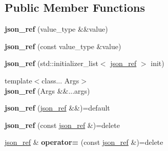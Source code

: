 \subsection*{Public Member Functions}
\begin{DoxyCompactItemize}
\item 
{\bfseries json\+\_\+ref} (value\+\_\+type \&\&value)\hypertarget{classnlohmann_1_1detail_1_1json__ref_ae1adf5bcee8b6fa0c358710604fb1938}{}\label{classnlohmann_1_1detail_1_1json__ref_ae1adf5bcee8b6fa0c358710604fb1938}

\item 
{\bfseries json\+\_\+ref} (const value\+\_\+type \&value)\hypertarget{classnlohmann_1_1detail_1_1json__ref_a8c3eb3c6e952ed0cd7eece586ab4047c}{}\label{classnlohmann_1_1detail_1_1json__ref_a8c3eb3c6e952ed0cd7eece586ab4047c}

\item 
{\bfseries json\+\_\+ref} (std\+::initializer\+\_\+list$<$ \hyperlink{classnlohmann_1_1detail_1_1json__ref}{json\+\_\+ref} $>$ init)\hypertarget{classnlohmann_1_1detail_1_1json__ref_adfba2db547283a7c6a5df9a32e72efc5}{}\label{classnlohmann_1_1detail_1_1json__ref_adfba2db547283a7c6a5df9a32e72efc5}

\item 
{\footnotesize template$<$class... Args$>$ }\\{\bfseries json\+\_\+ref} (Args \&\&...args)\hypertarget{classnlohmann_1_1detail_1_1json__ref_a84a813ad1c4b9524704b18684afd0708}{}\label{classnlohmann_1_1detail_1_1json__ref_a84a813ad1c4b9524704b18684afd0708}

\item 
{\bfseries json\+\_\+ref} (\hyperlink{classnlohmann_1_1detail_1_1json__ref}{json\+\_\+ref} \&\&)=default\hypertarget{classnlohmann_1_1detail_1_1json__ref_a59221ddbd756ca24d289c787fab38dbc}{}\label{classnlohmann_1_1detail_1_1json__ref_a59221ddbd756ca24d289c787fab38dbc}

\item 
{\bfseries json\+\_\+ref} (const \hyperlink{classnlohmann_1_1detail_1_1json__ref}{json\+\_\+ref} \&)=delete\hypertarget{classnlohmann_1_1detail_1_1json__ref_a4c68db46934e03588bbd73b00147c0dd}{}\label{classnlohmann_1_1detail_1_1json__ref_a4c68db46934e03588bbd73b00147c0dd}

\item 
\hyperlink{classnlohmann_1_1detail_1_1json__ref}{json\+\_\+ref} \& {\bfseries operator=} (const \hyperlink{classnlohmann_1_1detail_1_1json__ref}{json\+\_\+ref} \&)=delete\hypertarget{classnlohmann_1_1detail_1_1json__ref_a98956ba676b1ae16b62346f9c4fb752e}{}\label{classnlohmann_1_1detail_1_1json__ref_a98956ba676b1ae16b62346f9c4fb752e}


\end{DoxyCompactItemize}
